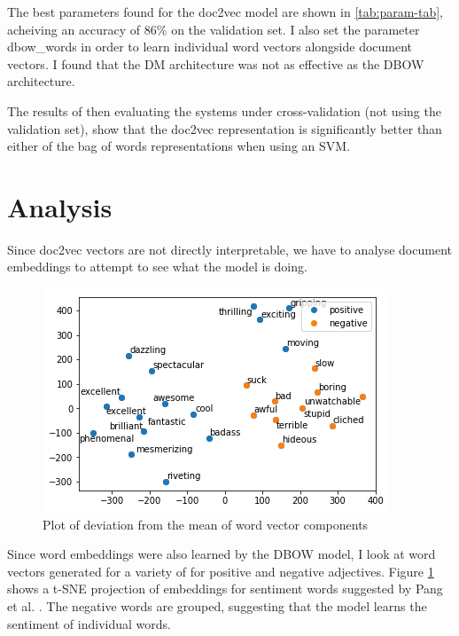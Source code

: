 \documentclass[a4paper]{article}
\begin{document}
\begin{multicols}{2}
The best parameters found for the doc2vec model are shown in \ref{tab:param-tab}, acheiving an accuracy of 86\% on the validation set. I also set the parameter dbow\_words in order to learn individual word vectors alongside document vectors. I found that the DM architecture was not as effective as the DBOW architecture.

The results of then evaluating the systems under cross-validation (not using the validation set), show that the doc2vec representation is significantly better than either of the bag of words representations when using an SVM.

\section{Analysis}

Since doc2vec vectors are not directly interpretable, we have to analyse document embeddings to attempt to see what the model is doing. 

\begin{figure}
  \centering
  \includegraphics{figs/adjectives.png}
  \caption{Plot of deviation from the mean of word vector components}
  \label{fig:adj-fig}
\end{figure}

Since word embeddings were also learned by the DBOW model, I look at word vectors generated for a variety of  for positive and negative adjectives. Figure \ref{fig:adj-fig} shows a t-SNE projection \cite{maaten2008visualizing} of embeddings for sentiment words suggested by Pang et al. \cite{pang2002thumbs}. The negative words are grouped, suggesting that the model learns the sentiment of individual words.


\end{multicols}
\end{document}
